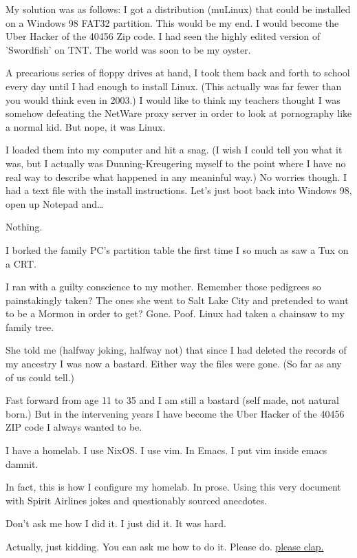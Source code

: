 \documentclass[11pt]{article}
\begin{document}
My solution was as follows: I got a distribution (muLinux) that could be installed on a Windows 98 FAT32 partition. This would be my end. I would become the Uber Hacker of the 40456 Zip code. I had seen the highly edited version of 'Swordfish' on TNT. The world was soon to be my oyster.

A precarious series of floppy drives at hand, I took them back and forth to school every day until I had enough to install Linux. (This actually was far fewer than you would think even in 2003.) I would like to think my teachers thought I was somehow defeating the NetWare proxy server in order to look at pornography like a normal kid. But nope, it was Linux. 

I loaded them into my computer and hit a snag. (I wish I could tell you what it was, but I actually was Dunning-Kreugering myself to the point where I have no real way to describe what happened in any meaninful way.) No worries though. I had a text file with the install instructions. Let's just boot back into Windows 98, open up Notepad and\ldots{}


Nothing.

I borked the family PC's partition table the first time I so much as saw a Tux on a CRT.

I ran with a guilty conscience to my mother. Remember those pedigrees so painstakingly taken? The ones she went to Salt Lake City and pretended to want to be a Mormon in order to get? Gone. Poof. Linux had taken a chainsaw to my family tree.

She told me (halfway joking, halfway not) that since I had deleted the records of my ancestry I was now a bastard. Either way the files were gone. (So far as any of us could tell.) 

Fast forward from age 11 to 35 and I am still a bastard (self made, not natural born.) But in the intervening years I have become the Uber Hacker of the 40456 ZIP code I always wanted to be.

I have a homelab. I use NixOS. I use vim. In Emacs. I put vim inside emacs damnit. 

In fact, this is how I configure my homelab. In prose. Using this very document with Spirit Airlines jokes and questionably sourced anecdotes. 

Don't ask me how I did it. I just did it. It was hard.

Actually, just kidding. You can ask me how to do it. Please do. \href{https://en.wikipedia.org/wiki/Please\_clap}{please clap.} 
\end{document}
